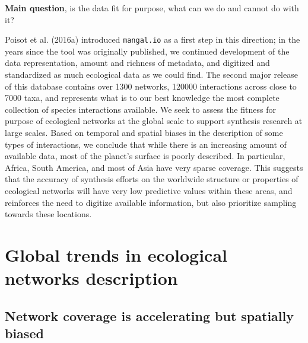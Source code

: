 \textbf{Main question}, is the data fit for purpose, what can we do and
cannot do with it?

Poisot et al. (2016a) introduced \texttt{mangal.io} as a first step in
this direction; in the years since the tool was originally published, we
continued development of the data representation, amount and richness of
metadata, and digitized and standardized as much ecological data as we
could find. The second major release of this database contains over 1300
networks, 120000 interactions across close to 7000 taxa, and represents
what is to our best knowledge the most complete collection of species
interactions available. We seek to assess the fitness for purpose of
ecological networks at the global scale to support synthesis research at
large scales. Based on temporal and spatial biases in the description of
some types of interactions, we conclude that while there is an
increasing amount of available data, most of the planet's surface is
poorly described. In particular, Africa, South America, and most of Asia
have very sparse coverage. This suggests that the accuracy of synthesis
efforts on the worldwide structure or properties of ecological networks
will have very low predictive values within these areas, and reinforces
the need to digitize available information, but also prioritize sampling
towards these locations.

\hypertarget{global-trends-in-ecological-networks-description}{%
\section{Global trends in ecological networks
description}\label{global-trends-in-ecological-networks-description}}

\hypertarget{network-coverage-is-accelerating-but-spatially-biased}{%
\subsection{Network coverage is accelerating but spatially
biased}\label{network-coverage-is-accelerating-but-spatially-biased}}

